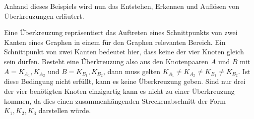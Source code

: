 Anhand dieses Beispiels wird nun das Entstehen, Erkennen und Auflösen von Überkreuzungen erläutert.

Eine Überkreuzung repräsentiert das Auftreten eines Schnittpunkts von zwei Kanten eines Graphen in einem für den Graphen relevanten Bereich.
Ein Schnittpunkt von zwei Kanten bedeutet hier, dass keine der vier Knoten gleich sein dürfen.
Besteht eine Überkreuzung also aus den Knotenpaaren $A$ und $B$ mit $A=K_{A_1},K_{A_2}$ und $B=K_{B_1},K_{B_2}$, dann muss gelten $K_{A_1} \neq K_{A_2} \neq K_{B_1} \neq K_{B_2}$.
Ist diese Bedingung nicht erfüllt, kann es keine Überkreuzung geben.
Sind nur drei der vier benötigten Knoten einzigartig kann es nicht zu einer Überkreuzung kommen, da dies einen zusammenhängenden Streckenabschnitt der Form $K_1, K_2, K_3$ darstellen würde.

